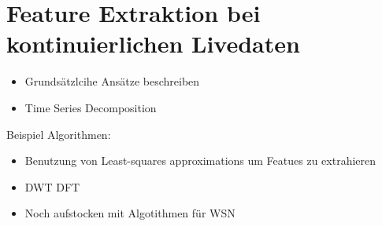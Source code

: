 \section{Feature Extraktion bei kontinuierlichen Livedaten}\label{kap:featureextraktion}
\begin{itemize}
  \item Grundsätzlcihe Ansätze beschreiben \cite{gensler2015fast}
  \item Time Series Decomposition \cite{Leonard2018}
\end{itemize}
Beispiel Algorithmen:
\begin{itemize}
  \item Benutzung von Least-squares approximations um Featues zu extrahieren
  \item DWT DFT \cite{gay2013feature}
  \item Noch aufstocken mit Algotithmen für WSN \cite{6805162}
\end{itemize}